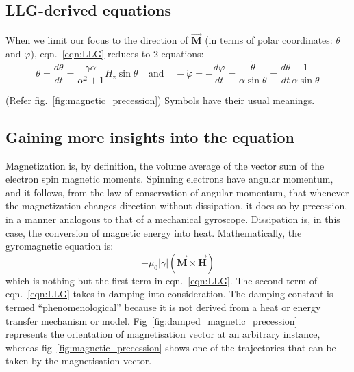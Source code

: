 {	\subsection{LLG-derived equations}
	{
		\vspace{0.25cm}
		When we limit our focus to the direction of $\overrightarrow{\mathbf{M}}$ (in terms of polar coordinates: $\theta$ and $\varphi$), eqn.~\ref{eqn:LLG} reduces to 2 equations:
		$$\dot{\theta}=\frac{d \theta}{d t}=\frac{\gamma \alpha}{\alpha^{2}+1}H_{\mathrm{z}} \sin \theta \,\,\,\,\,\;\text{and}\,\,\,\,\,\;-\dot{\varphi}=-\frac{d \varphi}{d t}=\frac{\dot{\theta}}{\alpha \sin \theta}=\frac{d \theta}{d t} \frac{1}{\alpha \sin \theta}$$
	
		(Refer fig.~\ref{fig:magnetic_precession}) Symbols have their usual meanings. ~\cite{Mallinson20001976}
	}

	\subsection{Gaining more insights into the equation}
	{
		\vspace{0.25cm}
		Magnetization is, by definition, the volume average of the vector sum of the electron spin magnetic moments. Spinning electrons have angular momentum, and it follows, from the law of conservation of angular momentum, that whenever the magnetization changes direction without dissipation, it does so by precession, in a manner analogous to that of a mechanical gyroscope. Dissipation is, in this case, the conversion of magnetic energy into heat. Mathematically, the gyromagnetic equation is:
		$$-\mu_0|\gamma| \left(\overrightarrow{\mathbf{M}} \times \overrightarrow{\mathbf{H}}\right)$$
		which is nothing but the first term in eqn.~\ref{eqn:LLG}.
		\newline
		\newline
		The second term of eqn.~\ref{eqn:LLG} takes in damping into consideration. The damping constant is termed “phenomenological” because it is not derived from a heat or energy transfer mechanism or model.
		\newline
		\newline
		Fig~\ref{fig:damped_magnetic_precession} ~\cite{Mallinson20001976}  represents the orientation of magnetisation vector at an arbitrary instance, whereas fig~\ref{fig:magnetic_precession} shows one of the trajectories that can be taken by the magnetisation vector.

}}

